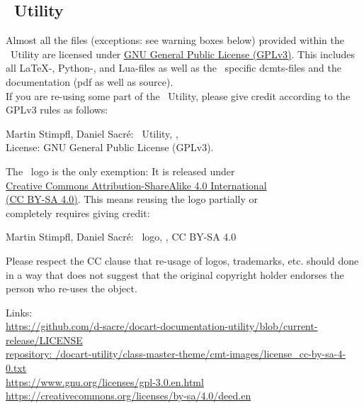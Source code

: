 		
		\newpage
		\subsection{\productName~Utility}
			Almost all the files (exceptions: see warning boxes below) provided within the \productName~Utility are licensed under \href{https://www.gnu.org/licenses/gpl-3.0.en.html}{GNU General Public License (GPLv3)}. This includes all \LaTeX-, Python-, and Lua-files as well as the \productName~specific dcmts-files and the documentation (pdf as well as source).\\
			If you are re-using some part of the \productName~Utility, please give credit according to the GPLv3 rules as follows:
			\begin{center}
				Martin Stimpfl, Daniel Sacré: \productName~Utility, \productVersion,\\ 
				License: GNU General Public License (GPLv3).
			\end{center}
			
			\begin{daWarningBox}
				The \productName~logo is the only exemption: It is released under\\	\href{https://creativecommons.org/licenses/by-sa/4.0/deed.en}{Creative Commons Attribution-ShareAlike 4.0 International\\ (CC BY-SA 4.0)}. This means reusing the logo partially or\\ completely requires giving credit:
				\begin{center}
					Martin Stimpfl, Daniel Sacré: \productName~logo, \productVersion, CC BY-SA 4.0		
				\end{center}
				Please respect the CC clause that re-usage of logos, trademarks, etc. should done in a way that does not suggest that the original copyright holder endorses the person who re-uses the object.
			\end{daWarningBox}
			\vspace{0.25cm}
			Links:\\[0.25cm]
			\textcolor{docartTurquoise!75}{\href{https://github.com/d-sacre/docart-documentation-utility/blob/current-release/LICENSE}{https://github.com/d-sacre/docart-documentation-utility/blob/current-release/LICENSE}}\\
			\textcolor{docartTurquoise!75}{\href{https://github.com/d-sacre/docart-documentation-utility/blob/current-release/docart-utility/class-naster-theme/cmt-images/license_cc-by-sa-4-0.txt}{repository: /docart-utility/class-master-theme/cmt-images/license\_cc-by-sa-4-0.txt}}\\
			\textcolor{docartTurquoise!75}{\href{https://www.gnu.org/licenses/gpl-3.0.en.html}{https://www.gnu.org/licenses/gpl-3.0.en.html}}\\
			\textcolor{docartTurquoise!75}{\href{https://creativecommons.org/licenses/by-sa/4.0/deed.en}{https://creativecommons.org/licenses/by-sa/4.0/deed.en}}
			
